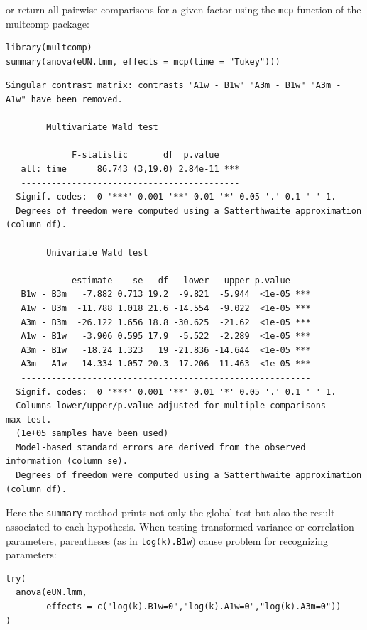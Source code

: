 \documentclass[12pt]{article}
\begin{document}
\clearpage

or return all pairwise comparisons for a given factor using the \texttt{mcp}
function of the multcomp package:
\lstset{language=r,label= ,caption= ,captionpos=b,numbers=none}
\begin{lstlisting}
library(multcomp)
summary(anova(eUN.lmm, effects = mcp(time = "Tukey")))
\end{lstlisting}

\begin{verbatim}
Singular contrast matrix: contrasts "A1w - B1w" "A3m - B1w" "A3m - A1w" have been removed. 

		Multivariate Wald test 

             F-statistic       df  p.value    
   all: time      86.743 (3,19.0) 2.84e-11 ***
   ------------------------------------------- 
  Signif. codes:  0 '***' 0.001 '**' 0.01 '*' 0.05 '.' 0.1 ' ' 1.
  Degrees of freedom were computed using a Satterthwaite approximation (column df). 

		Univariate Wald test 

             estimate    se   df   lower   upper p.value    
   B1w - B3m   -7.882 0.713 19.2  -9.821  -5.944  <1e-05 ***
   A1w - B3m  -11.788 1.018 21.6 -14.554  -9.022  <1e-05 ***
   A3m - B3m  -26.122 1.656 18.8 -30.625  -21.62  <1e-05 ***
   A1w - B1w   -3.906 0.595 17.9  -5.522  -2.289  <1e-05 ***
   A3m - B1w   -18.24 1.323   19 -21.836 -14.644  <1e-05 ***
   A3m - A1w  -14.334 1.057 20.3 -17.206 -11.463  <1e-05 ***
   --------------------------------------------------------- 
  Signif. codes:  0 '***' 0.001 '**' 0.01 '*' 0.05 '.' 0.1 ' ' 1.
  Columns lower/upper/p.value adjusted for multiple comparisons -- max-test.
  (1e+05 samples have been used)
  Model-based standard errors are derived from the observed information (column se). 
  Degrees of freedom were computed using a Satterthwaite approximation (column df).
\end{verbatim}

Here the \texttt{summary} method prints not only the global test but also the
result associated to each hypothesis. When testing transformed
variance or correlation parameters, parentheses (as in \texttt{log(k).B1w})
cause problem for recognizing parameters:
\lstset{language=r,label= ,caption= ,captionpos=b,numbers=none}
\begin{lstlisting}
try(
  anova(eUN.lmm,
        effects = c("log(k).B1w=0","log(k).A1w=0","log(k).A3m=0"))
)
\end{lstlisting}
\end{document}
